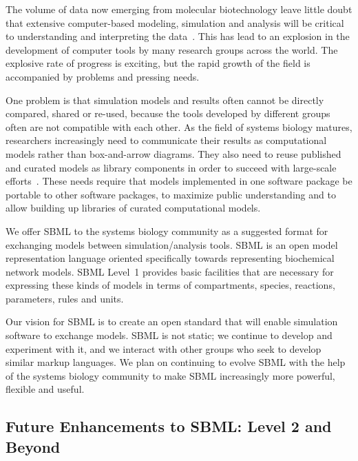 \documentclass[10pt]{cekarticle}
\newcommand{\changed}[1]{\textcolor{BrickRed}{#1}}
\begin{document}
The volume of data now emerging from molecular biotechnology
leave little doubt that extensive computer-based modeling, simulation and
analysis will be critical to understanding and interpreting the
data~\citep{abbott:1999,gilman:2000,popel:1998,smaglik:2000}.  This
has lead to an explosion in the development of computer tools by many
research groups across the world.  The explosive rate of progress is
exciting, but the rapid growth of the field is accompanied by problems and
pressing needs.

One problem is that simulation models and results often cannot be directly
compared, shared or re-used, because the tools developed by different
groups often are not compatible with each other.  As the field of systems
biology matures, researchers increasingly need to communicate their results
as computational models rather than box-and-arrow diagrams.  They also need
to reuse published and curated models as library components in order to
succeed with large-scale efforts~\cite[e.g., the Alliance for Cellular
Signaling;][]{gilman:2000,smaglik:2000}.  These needs require that models
implemented in one software package be portable to other software packages,
to maximize public understanding and to allow building up libraries of
curated computational models.

We offer SBML to the systems biology community as a suggested format for
exchanging models between simulation/analysis tools.  SBML is an open model
representation language oriented specifically towards representing
biochemical network models.  \changed{SBML Level~1 provides basic
  facilities} that are necessary for expressing these kinds of models in
terms of compartments, species, reactions, parameters, rules and units.

Our vision for SBML is to create an open standard that will enable
simulation software to exchange models.  SBML is not static; we continue to
develop and experiment with it, and we interact with other groups who seek
to develop similar markup languages.  We plan on continuing to evolve SBML
with the help of the systems biology community to make SBML increasingly
more powerful, flexible and useful.


\subsection{Future Enhancements to SBML: Level 2 and Beyond}
\label{sec:level-2}
\end{document}
